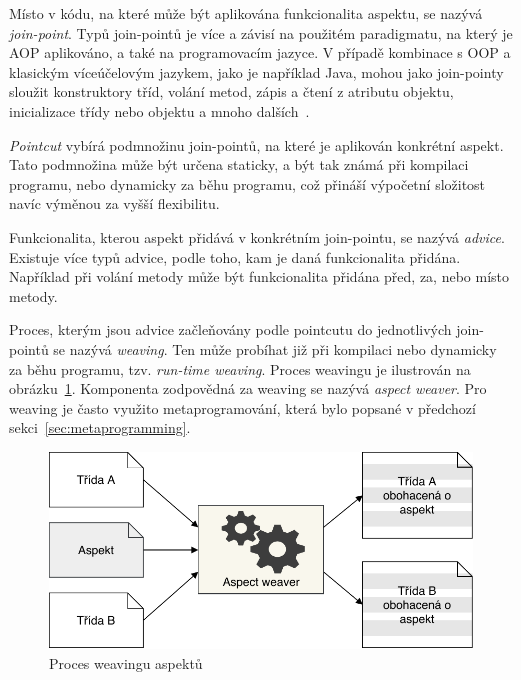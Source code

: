 Místo v kódu, na které může být aplikována funkcionalita aspektu, se nazývá
\textit{join-point}. Typů join-pointů je více a závisí na použitém paradigmatu,
na který je \gls{AOP} aplikováno, a také na programovacím jazyce. V případě
kombinace s \gls{OOP} a klasickým víceúčelovým jazykem, jako je například Java,
mohou jako join-pointy sloužit konstruktory tříd, volání metod, zápis a čtení
z atributu objektu, inicializace třídy nebo objektu a mnoho dalších~\cite{laddad2003aspectj}.

\textit{Pointcut} vybírá podmnožinu join-pointů, na které je aplikován konkrétní aspekt.
Tato podmnožina může být určena staticky, a být tak známá při kompilaci programu, nebo
dynamicky za běhu programu, což přináší výpočetní složitost navíc výměnou
za vyšší flexibilitu.

Funkcionalita, kterou aspekt přidává v konkrétním join-pointu, se nazývá
\textit{advice}. Existuje více typů advice, podle toho, kam je
daná funkcionalita přidána. Například při volání metody může
být funkcionalita přidána před, za, nebo místo metody.

Proces, kterým jsou advice začleňovány podle pointcutu do
jednotlivých join-pointů se nazývá \textit{weaving}. Ten může
probíhat již při kompilaci nebo dynamicky za běhu programu,
tzv. \textit{run-time weaving}. Proces weavingu je ilustrován
na obrázku~\ref{fig:aspect-weaving}. Komponenta zodpovědná za
weaving se nazývá \textit{aspect weaver}.
Pro weaving je často využito metaprogramování, která bylo popsané
v předchozí sekci~\ref{sec:metaprogramming}.

\begin{figure}[t]
    \centering
    \includegraphics[keepaspectratio=true, width=0.7\linewidth]{figures/aspect-weaving.pdf}
    \caption{Proces weavingu aspektů}
    \label{fig:aspect-weaving}
\end{figure}

